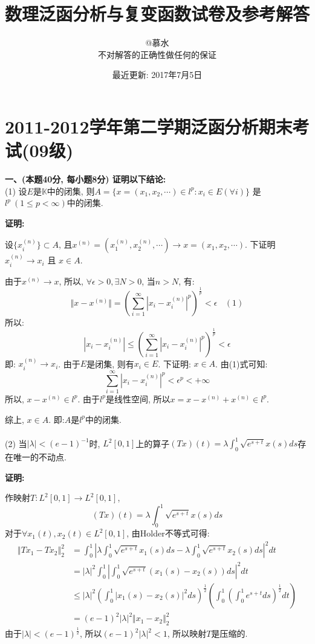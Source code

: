\documentclass{article}
\title{数理泛函分析与复变函数试卷及参考解答}
\author{@慕水 \\ 不对解答的正确性做任何的保证}
\date{最近更新: 2017年7月5日}
\begin{document}
\maketitle
\section{2011-2012学年第二学期泛函分析期末考试(09级)}
\textbf{一、(本题40分, 每小题8分) 证明以下结论:}  \\

(1) 设$E$是$\mathbb{K}$中的闭集, 则$A = \{ x=(x_1, x_2, \cdots) \in l^p: x_i \in E (\forall i) \}$ 是$l^p \  (1 \leq p < \infty)$中的闭集. 

\textbf{证明:} 

设$ \{x^{(n)}_i \} \subset A$, 且$ x^{(n)} = (x^{(n)}_1, x^{(n)}_2, \cdots) \rightarrow x = (x_1, x_2, \cdots)$. 下证明$x^{(n)}_i \rightarrow x_i$ 且 $x \in A$. 

由于$x^{(n)} \rightarrow x$, 所以, $\forall \epsilon >0, \exists N>0$, 当$n > N$, 有:
$$ \Vert{x - x^{(n)} }\Vert = ( \sum\limits_{i=1}^{\infty} |x_i - x^{(n)}_i|^p )^{\frac{1}{p}} < \epsilon \ \ \ \ (1) $$
所以:
$$ |x_i - x^{(n)}_i| \leq ( \sum\limits_{i=1}^{\infty} |x_i - x^{(n)}_i|^p)^{\frac{1}{p}} < \epsilon $$
即: $x^{(n)}_i \rightarrow x_i$. 由于$E$是闭集, 则有$x_i \in E$. 下证明: $x \in A$. 由(1)式可知:
$$ \sum\limits_{i=1}^{\infty} |x_i - x^{(n)}_i|^p < \epsilon^p < +\infty$$
所以, $x-x^{(n)} \in l^p$. 由于$l^p$是线性空间, 所以$x = x - x^{(n)} + x^{(n)} \in l^p$.

综上, $x \in A$. 即:$A$是$l^p$中的闭集. \\  \\


(2) 当$|\lambda| < (e-1)^{-1}$时, $L^2[0,1]$上的算子$(Tx)(t) = \lambda \int_0^1 \sqrt{e^{s+t}}x(s)ds$存在唯一的不动点. 

\textbf{证明:} 

作映射$T: L^2[0,1] \rightarrow L^2[0,1]$,
$$ (Tx)(t) = \lambda \int_0^1 \sqrt{e^{s+t}}x(s)ds $$
对于$\forall x_1(t), x_2(t) \in L^2[0,1]$, 由Holder不等式可得:
\begin{align*}
\Vert Tx_1 - Tx_2 \Vert_2^2 &= \int_0^1|\lambda \int_0^1 \sqrt{e^{s+t}}x_1(s)ds - \lambda \int_0^1 \sqrt{e^{s+t}}x_2(s)ds|^2 dt \\
 & = |\lambda|^2 \int_0^1|\int_0^1 \sqrt{e^{s+t}}(x_1(s) - x_2(s))ds|^2 dt \\
 & \leq |\lambda|^2 (\int_0^1 |x_1(s) - x_2(s)|^2ds)^{\frac{1}{2}}(\int_0^1 (\int_0^1 e^{s+t}ds)^{\frac{1}{2}}dt)  \\
 & = (e-1)^2|\lambda|^2 \Vert x_1 - x_2 \Vert_2^2
\end{align*}
由于$|\lambda| < (e-1)^{\frac{1}{2}}$, 所以$(e-1)^2|\lambda|^2 < 1$, 所以映射$T$是压缩的.
\end{document}
